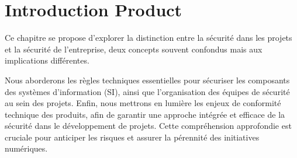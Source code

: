 
\section{Introduction Product}


Ce chapitre se propose d'explorer la distinction entre la sécurité dans les projets et la sécurité de l'entreprise, deux concepts souvent confondus mais aux implications différentes. 

Nous aborderons les règles techniques essentielles pour sécuriser les composants des systèmes d'information (SI), ainsi que l'organisation des équipes de sécurité au sein des projets. Enfin, nous mettrons en lumière les enjeux de conformité technique des produits, afin de garantir une approche intégrée et efficace de la sécurité dans le développement de projets. Cette compréhension approfondie est cruciale pour anticiper les risques et assurer la pérennité des initiatives numériques.

